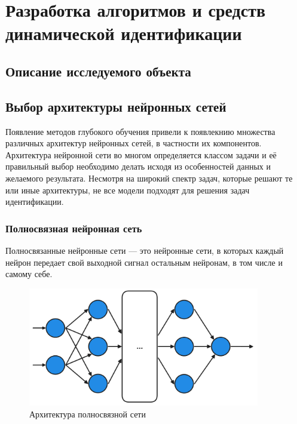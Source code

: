 \chapter{Разработка алгоритмов и средств динамической идентификации}
 
\section{Описание исследуемого объекта}

\section{Выбор архитектуры нейронных сетей}

Появление методов глубокого обучения привели к появлекнию множества различных архитектур нейронных сетей, в частности их компонентов. Архитектура нейронной сети во многом определяется классом задачи и её правильный выбор необходимо делать исходя из особенностей данных и желаемого результата. Несмотря на широкий спектр задач, которые решают те или иные архитектуры, не все модели подходят для решения задач идентификации.

\subsection{Полносвязная нейронная сеть}

Полносвязанные нейронные сети — это нейронные сети, в которых каждый 
нейрон передает свой выходной сигнал остальным нейронам, в том числе 
и самому себе. 

\begin{figure}[htbp]
  \centering
    \includegraphics[width=0.9\textwidth]{figures/arch_fully_connected.png}
  \caption{Архитектура полносвязной сети}\label{fig:dense_nn}
\end{figure}

